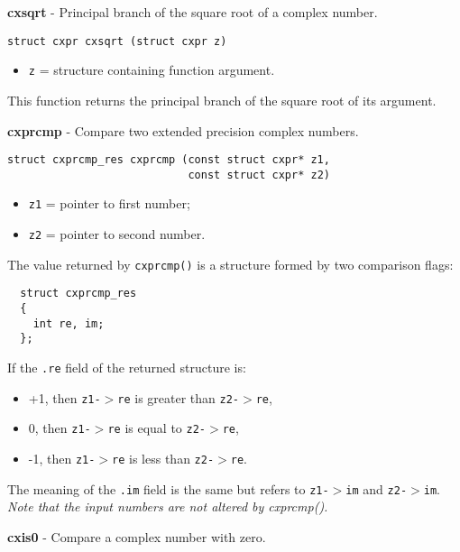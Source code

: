 \documentclass{article}
\begin{document}
\hrulefill{}

\textbf{cxsqrt} - Principal branch of the square root of a complex number.

\begin{verbatim}
struct cxpr cxsqrt (struct cxpr z)
\end{verbatim}

\begin{itemize}
\item \texttt{z} = structure containing function argument.
\end{itemize}

This function returns the principal branch of
the square root of its argument.


\hrulefill{}

\textbf{cxprcmp} - Compare two extended precision complex numbers.

\begin{verbatim}
struct cxprcmp_res cxprcmp (const struct cxpr* z1,
                            const struct cxpr* z2)
\end{verbatim}

\begin{itemize}
\item \texttt{z1} = pointer to first number;
\item \texttt{z2} = pointer to second number.
\end{itemize}

The value returned by \texttt{cxprcmp()} is a structure formed by two
comparison flags:

\begin{verbatim}
  struct cxprcmp_res
  {
    int re, im;
  };
\end{verbatim}
If the \texttt{.re} field of the returned structure is:

\begin{itemize}
\item +1, then \texttt{z1-$>$re} is greater than \texttt{z2-$>$re},
\item 0, then \texttt{z1-$>$re} is equal to \texttt{z2-$>$re},
\item -1, then \texttt{z1-$>$re} is less than \texttt{z2-$>$re}.
\end{itemize}

The meaning of the \texttt{.im} field is the same but refers
to \texttt{z1-$>$im} and \texttt{z2-$>$im}.
\textit{Note that the input numbers are not altered by cxprcmp().}


\hrulefill{}

\textbf{cxis0} - Compare a complex number with zero.
\end{document}
